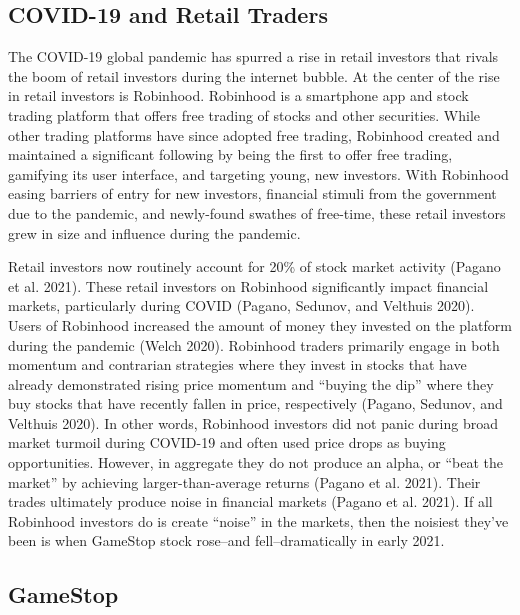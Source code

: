 \documentclass[12pt,]{article}
\begin{document}
\hypertarget{covid-19-and-retail-traders}{%
\subsection{COVID-19 and Retail
Traders}\label{covid-19-and-retail-traders}}

The COVID-19 global pandemic has spurred a rise in retail investors that
rivals the boom of retail investors during the internet bubble. At the
center of the rise in retail investors is Robinhood. Robinhood is a
smartphone app and stock trading platform that offers free trading of
stocks and other securities. While other trading platforms have since
adopted free trading, Robinhood created and maintained a significant
following by being the first to offer free trading, gamifying its user
interface, and targeting young, new investors. With Robinhood easing
barriers of entry for new investors, financial stimuli from the
government due to the pandemic, and newly-found swathes of free-time,
these retail investors grew in size and influence during the pandemic.

Retail investors now routinely account for 20\% of stock market activity
(Pagano et al. 2021). These retail investors on Robinhood significantly
impact financial markets, particularly during COVID (Pagano, Sedunov,
and Velthuis 2020). Users of Robinhood increased the amount of money
they invested on the platform during the pandemic (Welch 2020).
Robinhood traders primarily engage in both momentum and contrarian
strategies where they invest in stocks that have already demonstrated
rising price momentum and ``buying the dip'' where they buy stocks that
have recently fallen in price, respectively (Pagano, Sedunov, and
Velthuis 2020). In other words, Robinhood investors did not panic during
broad market turmoil during COVID-19 and often used price drops as
buying opportunities. However, in aggregate they do not produce an
alpha, or ``beat the market'' by achieving larger-than-average returns
(Pagano et al. 2021). Their trades ultimately produce noise in financial
markets (Pagano et al. 2021). If all Robinhood investors do is create
``noise'' in the markets, then the noisiest they've been is when
GameStop stock rose--and fell--dramatically in early 2021.

\hypertarget{gamestop}{%
\subsection{GameStop}\label{gamestop}}
\end{document}

